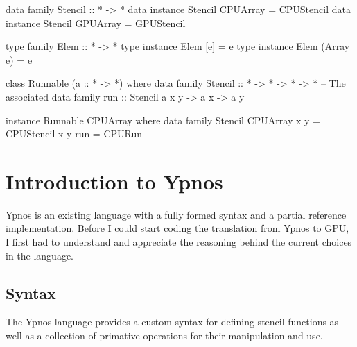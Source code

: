 \documentclass[12pt,a4paper,twoside]{scrbook}
\begin{document}
\begin{hflisting}[label=lst:datafam, caption=The data family declares two
  different constructors for a stencil depending on the type of array the
  stencil is run on.]

data family Stencil :: * -> *
data instance Stencil CPUArray = CPUStencil
data instance Stencil GPUArray = GPUStencil

\end{hflisting}

\begin{hflisting}[label=lst:typesynfam, caption=The type synonym family is used
  as a type function. It is used to work out the element type of a collection.]

type family Elem :: * -> *
type instance Elem [e] = e
type instance Elem (Array e) = e

\end{hflisting}

\begin{hflisting}[label=lst:assoctypefam, caption={The data family from
  listing~\ref{lst:datafam} has now been associated with the class
  \texttt{Runnable} for certain types of array.}]

class Runnable (a :: * -> *) where
  data family Stencil :: * -> * -> * -> * -- The associated data family
  run :: Stencil a x y -> a x -> a y

instance Runnable CPUArray where
  data family Stencil CPUArray x y = CPUStencil x y
  run = CPURun

\end{hflisting}

\section{Introduction to Ypnos}

Ypnos is an existing language with a fully formed syntax and a partial reference
implementation. Before I could start coding the translation from Ypnos to GPU, I
first had to understand and appreciate the reasoning behind the current choices
in the language.

\subsection{Syntax}

The Ypnos language provides a custom syntax for defining stencil functions as
well as a collection of primative operations for their manipulation and use.
\end{document}
